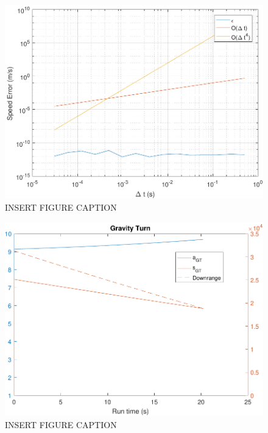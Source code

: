 \begin{figure}[H]
	\centering
	\begin{minipage}{4.5 in}
		\includegraphics[width=\linewidth]{Figures/convtestvac.pdf}
		\caption{INSERT FIGURE CAPTION \label{fig:convtestvac} }
	\end{minipage}
\end{figure}






\begin{figure}[H]
	\centering
	\begin{minipage}{4.5 in}
		\includegraphics[width=\linewidth]{Figures/gtcriterion.pdf}
		\caption{INSERT FIGURE CAPTION \label{fig:gtcriterion} }
	\end{minipage}
\end{figure}




